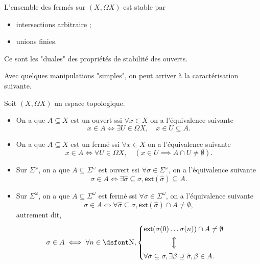 \documentclass[./main]{subfiles}
\begin{document}
  \begin{rmk}
    L'ensemble des fermés sur $(X, \Omega X)$ est stable par 
    \begin{itemize}
      \item intersections arbitraire ;
      \item unions finies.
    \end{itemize}
    Ce sont les "duales" des propriétés de stabilité des ouverts.
  \end{rmk}

  Avec quelques manipulations "simples", on peut arriver à la caractérisation suivante.

  \begin{lem}
    Soit $(X, \Omega X)$ un espace topologique.
    \begin{itemize}
      \item On a que $A \subseteq X$ est un ouvert ssi $\forall x \in X$ on a l'équivalence suivante 
        \[
        x \in A \iff \exists  U \in \Omega X, \quad x \in U \subseteq A
        .\]
      \item On a que $A \subseteq X$ est un fermé ssi $\forall x \in X$ on a l'équivalence suivante 
        \[
        x \in A \iff \forall U \in \Omega X, \quad (x \in U \implies A \cap U \neq \emptyset)
        .\]
    \end{itemize}
  \end{lem}

  \begin{lem}
     \begin{itemize}
      \item Sur $\Sigma^\omega$, on a que  $A \subseteq \Sigma^\omega$ est ouvert ssi $\forall \sigma \in \Sigma^\omega$, on a l'équivalence suivante 
        \[
        \sigma \in A \iff \exists \hat{\sigma} \subseteq \sigma, \mathsf{ext}(\hat{\sigma}) \subseteq A
        .\] 
      \item Sur $\Sigma^\omega$, on a que  $A \subseteq \Sigma^\omega$ est fermé ssi $\forall \sigma \in \Sigma^\omega$, on a l'équivalence suivante 
        \[
        \sigma \in A \iff \forall \hat{\sigma} \subseteq \sigma, \mathsf{ext}(\hat{\sigma}) \cap A \neq \emptyset
        ,\] 
        autrement dit,\[
        \sigma \in A \iff \forall n \in \mathds{N}, \begin{cases}
          \mathsf{ext}(\sigma(0)\ldots \sigma(n)) \cap A \neq \emptyset\\
          \quad\quad\quad\quad\vertical\iff\\
          \forall \hat{\sigma} \subseteq \sigma, \exists \beta \supseteq \hat{\sigma}, \beta \in A.
        \end{cases}
        \]
    \end{itemize}
  \end{lem}
\end{document}
